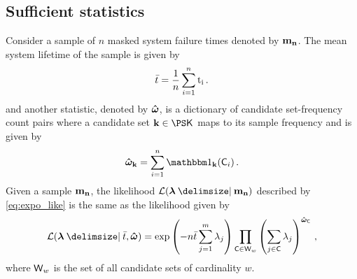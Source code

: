 \documentclass[
    11pt,
    extrafontsizes,
    article,
    oldfontcommands,
    final,
    oneside,
    openany,
    hidelinks]{memoir}
\begin{document}
\subsection{Sufficient statistics}
\label{sec:expo_sufficient}
Consider a sample of $n$ masked system failure times denoted by $\boldsymbol{\mathbf{m_n}}$. The mean system lifetime of the sample is given by
\begin{equation}
    \bar{t} = \frac{1}{n} \sum_{i=1}^{n} \rm{t}_i\,.
\end{equation}
and another statistic, denoted by $\boldsymbol{\hat\omega}$, is a dictionary of candidate set-frequency count pairs where a candidate set $\vec{k} \in \cands$ maps to its sample frequency and is given by
\begin{equation}
    \cntsymb_{\vec{k}} = \sum_{i=1}^{n} \SetIndicator{\vec{k}}(\cand_i)\,.
\end{equation}
Given a sample $\boldsymbol{\mathbf{m_n}}$, the likelihood $\likelihood(\vec\lambda \Given \mfso)$ described by \cref{eq:expo_like} is the same as the likelihood given by
\begin{equation}
\likelihood(\vec\lambda \Given \bar t, \cntsymb) =
    \exp \left( -n \bar{t} \sum_{j=1}^{m} \lambda_j \right)
    \prod_{\cand \in \candsw{w}} \left ( \sum_{j \in \cand} \lambda_j \right )^{\cntsymb_{\cand}}\,,
\end{equation}
where $\candsw{w}$ is the set of all candidate sets of cardinality $w$.
\end{document}
